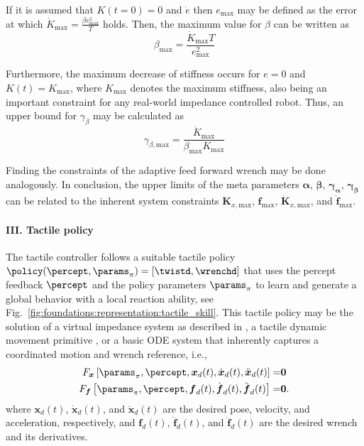  If it is assumed that $K(t=0)=0$ and $\dot{e}$ then $e_\text{max}$ may be defined as the error at which $\dot{K}_\text{max}=\frac{\beta e_\text{max}^2}{T}$ holds.
 Then, the maximum value for $\beta$ can be written as
 \begin{equation*}
     \beta_\text{max}=\frac{\dot{K}_\text{max}T}{e_\text{max}^2}
 \end{equation*}

 Furthermore, the maximum decrease of stiffness occurs for $e=0$ and $K(t)=K_\text{max}$, where $K_\text{max}$ denotes the maximum stiffness, also being an important constraint for any real-world impedance controlled robot.
 Thus, an upper bound for $\gamma_\beta$ may be calculated as
 \begin{equation*}
     \gamma_{\beta,\text{max}}=\frac{\dot{K}_\text{max}}{\beta_\text{max}K_\text{max}}
 \end{equation*}

 Finding the constraints of the adaptive feed forward wrench may be done analogously.
 In conclusion, the upper limits of the meta parameters $\boldsymbol{\alpha}$, $\boldsymbol{\beta}$, $\boldsymbol{\gamma_\alpha}$, $\boldsymbol{\gamma_\beta}$ can be related to the inherent system constraints $\boldsymbol{K}_{x,\text{max}}$, $\boldsymbol{f}_\text{max}$, $\dot{\boldsymbol{K}}_{x,\text{max}}$, and $\dot{\boldsymbol{f}}_\text{max}$.

\paragraph*{III. Tactile policy}
 The tactile controller follows a suitable tactile policy $\policy (\percept,\params_\pi)=\left[\twistd,\wrenchd\right]$ that uses the percept feedback $\percept$ and the policy parameters $\params_\pi$ to learn and generate a global behavior with a local reaction ability, see Fig.~\ref{fig:foundations:representation:tactile_skill}.
 This tactile policy may be the solution of a virtual impedance system as described in \cite{li2018force}, a tactile dynamic movement primitive \cite{shahriari2017adapting}, or a basic ODE system that inherently captures a coordinated motion and wrench reference, i.e.,
 \begin{align*}F_{\boldsymbol{x}}\left[\params_\pi,\percept,\boldsymbol{x}_d(t),\dot{\boldsymbol{x}}_d(t),\ddot{\boldsymbol{x}}_d(t)\right]= & \boldsymbol{0} \\
    F_{\boldsymbol{f}}\left[\params_\pi,\percept,\boldsymbol{f}_d(t),\dot{\boldsymbol{f}}_d(t),\ddot{\boldsymbol{f}}_d(t)\right]= & \boldsymbol{0}.
\end{align*}
where $\boldsymbol{x}_d(t)$, $\dot{\boldsymbol{x}}_d(t)$, and $\ddot{\boldsymbol{x}}_d(t)$ are the desired pose, velocity, and acceleration, respectively, and $\boldsymbol{f}_d(t)$, $\dot{\boldsymbol{f}}_d(t)$, and $\ddot{\boldsymbol{f}}_d(t)$ are the desired wrench and its derivatives.

